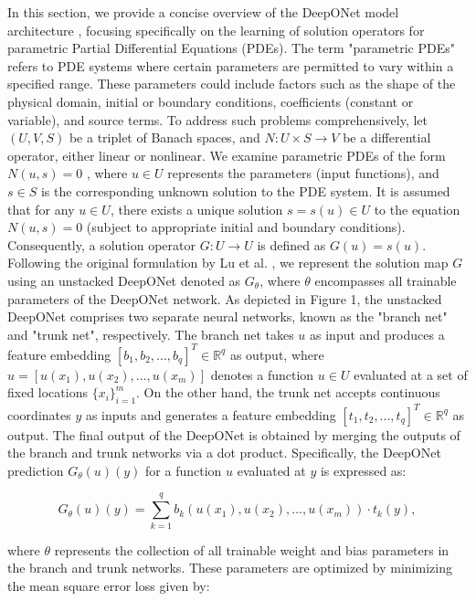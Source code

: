 \documentclass[a4paper, onecolumn, 12pt]{article}
\begin{document}
In this section, we provide a concise overview of the DeepONet model architecture \cite{PIDeeponet2021}, 
focusing specifically on the learning of solution operators for parametric Partial Differential Equations
(PDEs). The term "parametric PDEs" refers to PDE systems where certain parameters are permitted to vary 
within a specified range. These parameters could include factors such as the shape of the physical domain,
initial or boundary conditions, coefficients (constant or variable), and source terms. To address such 
problems comprehensively, let $(U, V, S)$ be a triplet of Banach spaces, and $N: U \times S \rightarrow
V$ be a differential operator, either linear or nonlinear. We examine parametric PDEs of the form 
$N(u, s) = 0$ \cite{PIDeeponet2021}, where $u \in U$ represents the parameters (input functions),
and $s \in S$ is the corresponding unknown solution to the PDE system. It is assumed that for any
$u \in U$, there exists a unique solution $s = s(u) \in U$ to the equation $N(u, s) = 0$ (subject to
appropriate initial and boundary conditions). Consequently, a solution operator $G: U \rightarrow U$ 
is defined as $G(u) = s(u)$. Following the original formulation by Lu et al. \cite{PIDeeponet2021}, we
represent the solution map $G$ using an unstacked DeepONet denoted as $G_{\theta}$, where $\theta$ 
encompasses all trainable parameters of the DeepONet network. As depicted in Figure 1, the unstacked
DeepONet comprises two separate neural networks, known as the "branch net" and "trunk net", respectively. 
The branch net takes $u$ as input and produces a feature embedding $[b_1, b_2, ..., b_q]^T \in \mathbb{R}^q$
as output, where $u = [u(x_1), u(x_2), ..., u(x_m)]$ denotes a function $u \in U$ evaluated at a set of 
fixed locations $\{x_i\}_{i=1}^m$. On the other hand, the trunk net accepts continuous coordinates $y$ as
inputs and generates a feature embedding $[t_1, t_2, ..., t_q]^T \in \mathbb{R}^q$ as output. The final 
output of the DeepONet is obtained by merging the outputs of the branch and trunk networks via a dot 
product. Specifically, the DeepONet prediction $G_{\theta}(u)(y)$ for a function $u$ evaluated at $y$
is expressed as:

\begin{equation}
G_{\theta}(u)(y) = \sum_{k=1}^{q} b_k(u(x_1), u(x_2), ..., u(x_m)) \cdot t_k(y),
\end{equation}

where $\theta$ represents the collection of all trainable weight and bias parameters in the branch and trunk networks. These parameters are optimized by minimizing the mean square error loss given by:
\end{document}
